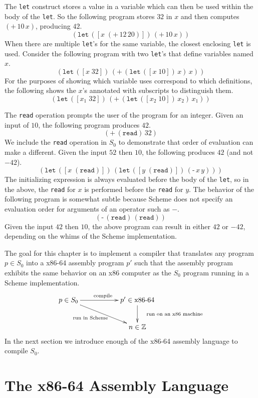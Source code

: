 \documentclass[12pt]{book}
\newcommand{\key}[1]{\texttt{#1}}
\newcommand{\READ}{(\key{read})}
\newcommand{\BINOP}[3]{(\key{#1}\,#2\,#3)}
\newcommand{\LET}[3]{(\key{let}\,([#1\;#2])\,#3)}
\begin{document}
The \key{let} construct stores a value in a variable which can then be
used within the body of the \key{let}. So the following program stores
$32$ in $x$ and then computes $\BINOP{+}{10}{x}$, producing $42$.
\[
\LET{x}{ \BINOP{+}{12}{20} }{ \BINOP{+}{10}{x} } 
\]
When there are multiple \key{let}'s for the same variable, the closest
enclosing \key{let} is used. Consider the following program with two
\key{let}'s that define variables named $x$.
\[
\LET{x}{32}{ \BINOP{+}{ \LET{x}{10}{x} }{ x } }
\]
For the purposes of showing which variable uses correspond to which
definitions, the following shows the $x$'s annotated with subscripts
to distinguish them.
\[
\LET{x_1}{32}{ \BINOP{+}{ \LET{x_2}{10}{x_2} }{ x_1 } }
\]

The \key{read} operation prompts the user of the program for an
integer. Given an input of $10$, the following program produces $42$.
\[
\BINOP{+}{(\key{read})}{32}
\]
We include the \key{read} operation in $S_0$ to demonstrate that order
of evaluation can make a different. Given the input $52$ then $10$,
the following produces $42$ (and not $-42$).
\[
\LET{x}{\READ}{ \LET{y}{\READ}{ \BINOP{-}{x}{y} } }
\]
The initializing expression is always evaluated before the body of the
\key{let}, so in the above, the \key{read} for $x$ is performed before
the \key{read} for $y$.
%
The behavior of the following program is somewhat subtle because
Scheme does not specify an evaluation order for arguments of an
operator such as $-$.
\[
\BINOP{-}{\READ}{\READ}
\]
Given the input $42$ then $10$, the above program can result in either
$42$ or $-42$, depending on the whims of the Scheme implementation.

The goal for this chapter is to implement a compiler that translates
any program $p \in S_0$ into a x86-64 assembly program $p'$ such that
the assembly program exhibits the same behavior on an x86 computer as
the $S_0$ program running in a Scheme implementation.
\[
\xymatrix{
p \in S_0  \ar[rr]^{\text{compile}} \ar[drr]_{\text{run in Scheme}\quad}   &&  p' \in \text{x86-64} \ar[d]^{\quad\text{run on an x86 machine}}\\
& & n \in \mathbb{Z}   
}
\]
In the next section we introduce enough of the x86-64 assembly
language to compile $S_0$.

\section{The x86-64 Assembly Language}
\end{document}
